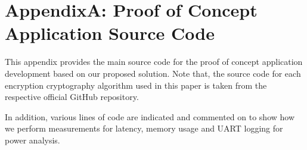 
\chapter{AppendixA: Proof of Concept Application Source Code } %

\label{AppendixA} %

This appendix provides the main source code for the proof of concept application development based on our proposed solution. Note that, the source code for each encryption cryptography algorithm used in this paper is taken from the respective official GitHub repository. 

In addition, various lines of code are indicated and commented on to show how we perform measurements for latency, memory usage and UART logging for power analysis. 


